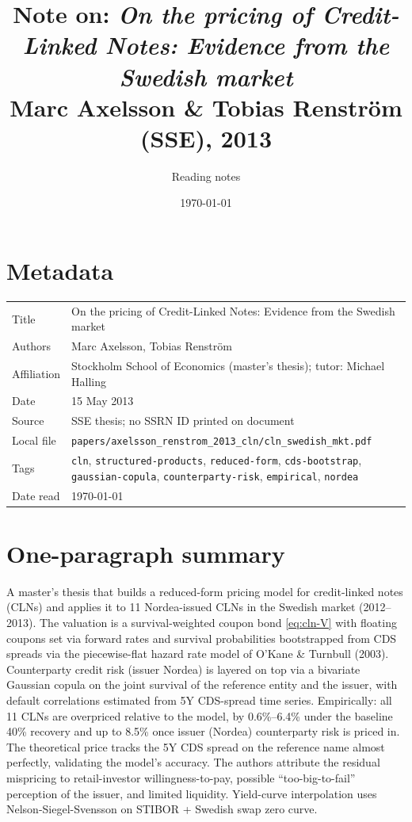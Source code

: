 \documentclass[11pt,a4paper]{article}
\title{Note on: \emph{On the pricing of Credit-Linked Notes: Evidence from the Swedish market}\\
       \large Marc Axelsson \& Tobias Renström (SSE), 2013}
\author{Reading notes}
\date{\today}
\begin{document}
\maketitle

\section*{Metadata}
\begin{tabular}{@{}p{3.5cm}p{11cm}@{}}
\toprule
Title           & On the pricing of Credit-Linked Notes: Evidence from the Swedish market \\
Authors         & Marc Axelsson, Tobias Renström \\
Affiliation     & Stockholm School of Economics (master's thesis); tutor: Michael Halling \\
Date            & 15 May 2013 \\
Source          & SSE thesis; no SSRN ID printed on document \\
Local file      & \texttt{papers/axelsson\_renstrom\_2013\_cln/cln\_swedish\_mkt.pdf} \\
Tags            & \texttt{cln}, \texttt{structured-products}, \texttt{reduced-form},
                  \texttt{cds-bootstrap}, \texttt{gaussian-copula}, \texttt{counterparty-risk},
                  \texttt{empirical}, \texttt{nordea} \\
Date read       & \today \\
\bottomrule
\end{tabular}

\section*{One-paragraph summary}
A master's thesis that builds a reduced-form pricing model for
credit-linked notes (CLNs) and applies it to 11 Nordea-issued CLNs in
the Swedish market (2012--2013). The valuation is a survival-weighted
coupon bond \eqref{eq:cln-V} with floating coupons set via forward
rates and survival probabilities bootstrapped from CDS spreads via the
piecewise-flat hazard rate model of O'Kane \& Turnbull (2003).
Counterparty credit risk (issuer Nordea) is layered on top via a
bivariate Gaussian copula on the joint survival of the reference
entity and the issuer, with default correlations estimated from
5Y CDS-spread time series. Empirically: all 11 CLNs are overpriced
relative to the model, by 0.6\%--6.4\% under the baseline 40\%
recovery and up to 8.5\% once issuer (Nordea) counterparty risk is
priced in. The theoretical price tracks the 5Y CDS spread on the
reference name almost perfectly, validating the model's accuracy. The
authors attribute the residual mispricing to retail-investor
willingness-to-pay, possible ``too-big-to-fail'' perception of the
issuer, and limited liquidity. Yield-curve interpolation uses
Nelson-Siegel-Svensson on STIBOR + Swedish swap zero curve.
\end{document}
